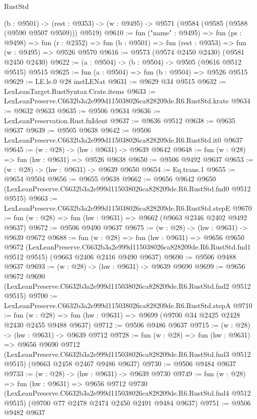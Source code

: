 \begin{lexlean}{RustStd}
\begin{coremodule}
  (b : @9501) ->
  (rest : @9353) -> (w : @9495) -> @9571 (@9584 (@9585 (@9588 (@9590 @9507 @9509))) @9519)
@9610 := fun ("name" : @9495) =>
  fun (ps : @9498) =>
  fun (r : @2352) => fun (b : @9501) => fun (rest : @9353) => fun (w : @9495) => @9526 @9570
@9616 := @9573 (@9574 @2450 @2430) (@9581 @2450 @2430)
@9622 := (a : @9504) -> (b : @9504) -> @9505 (@9616 @9512 @9515) @9515
@9625 := fun (a : @9504) => fun (b : @9504) => @9526 @9515
@9629 := LE.le.{0} @28 instLENat
@9631 := @9629 @34 @9515
@9632 := LexLeanTarget.RustSyntax.Crate.items
@9633 := LexLeanPreserve.C6632b3a2e999d115038026ca828209de.R6.RustStd.krate
@9634 := @9632 @9633
@9635 := @9506 @9634
@9636 := LexLeanPreservation.Rust.fnIdent
@9637 := @9636 @9512
@9638 := @9635 @9637
@9639 := @9505 @9638
@9642 := @9506 LexLeanPreserve.C6632b3a2e999d115038026ca828209de.R6.RustStd.it0 @9637
@9645 := (w : @28) -> (hw : @9631) -> @9639 @9642
@9648 := fun (w : @28) => fun (hw : @9631) => @9526 @9638
@9650 := @9506 @9492 @9637
@9653 := (w : @28) -> (hw : @9631) -> @9639 @9650
@9654 := Eq.trans.{1}
@9655 := @9654 @9504
@9656 := @9655 @9638
@9662 := @9656
    @9642
    @9650
    (LexLeanPreserve.C6632b3a2e999d115038026ca828209de.R6.RustStd.fnd0 @9512 @9515)
@9663 := LexLeanPreserve.C6632b3a2e999d115038026ca828209de.R6.RustStd.stepE
@9670 := fun (w : @28) => fun (hw : @9631) => @9662 (@9663 @2346 @2402 @9492 @9637)
@9672 := @9506 @9490 @9637
@9675 := (w : @28) -> (hw : @9631) -> @9639 @9672
@9688 := fun (w : @28) =>
  fun (hw : @9631) =>
  @9656
    @9650
    @9672
    (LexLeanPreserve.C6632b3a2e999d115038026ca828209de.R6.RustStd.fnd1 @9512 @9515)
    (@9663 @2406 @2416 @9490 @9637)
@9690 := @9506 @9488 @9637
@9693 := (w : @28) -> (hw : @9631) -> @9639 @9690
@9699 := @9656
    @9672
    @9690
    (LexLeanPreserve.C6632b3a2e999d115038026ca828209de.R6.RustStd.fnd2 @9512 @9515)
@9700 := LexLeanPreserve.C6632b3a2e999d115038026ca828209de.R6.RustStd.stepA
@9710 := fun (w : @28) => fun (hw : @9631) => @9699 (@9700 @34 @2425 @2428 @2430 @2455 @9488 @9637)
@9712 := @9506 @9486 @9637
@9715 := (w : @28) -> (hw : @9631) -> @9639 @9712
@9728 := fun (w : @28) =>
  fun (hw : @9631) =>
  @9656
    @9690
    @9712
    (LexLeanPreserve.C6632b3a2e999d115038026ca828209de.R6.RustStd.fnd3 @9512 @9515)
    (@9663 @2458 @2467 @9486 @9637)
@9730 := @9506 @9484 @9637
@9733 := (w : @28) -> (hw : @9631) -> @9639 @9730
@9749 := fun (w : @28) =>
  fun (hw : @9631) =>
  @9656
    @9712
    @9730
    (LexLeanPreserve.C6632b3a2e999d115038026ca828209de.R6.RustStd.fnd4 @9512 @9515)
    (@9700 @77 @2478 @2474 @2450 @2491 @9484 @9637)
@9751 := @9506 @9482 @9637

\end{coremodule}
\end{lexlean}
